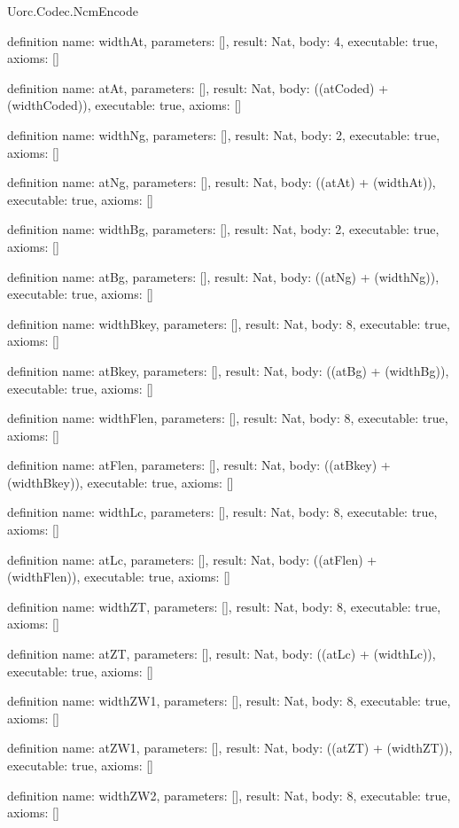 \begin{lexlean}{Uorc.Codec.NcmEncode}
\begin{semanticmodule}
definition{
  name: widthAt,
  parameters: [],
  result: Nat,
  body: 4,
  executable: true,
  axioms: []
}

definition{
  name: atAt,
  parameters: [],
  result: Nat,
  body: ((atCoded) + (widthCoded)),
  executable: true,
  axioms: []
}

definition{
  name: widthNg,
  parameters: [],
  result: Nat,
  body: 2,
  executable: true,
  axioms: []
}

definition{
  name: atNg,
  parameters: [],
  result: Nat,
  body: ((atAt) + (widthAt)),
  executable: true,
  axioms: []
}

definition{
  name: widthBg,
  parameters: [],
  result: Nat,
  body: 2,
  executable: true,
  axioms: []
}

definition{
  name: atBg,
  parameters: [],
  result: Nat,
  body: ((atNg) + (widthNg)),
  executable: true,
  axioms: []
}

definition{
  name: widthBkey,
  parameters: [],
  result: Nat,
  body: 8,
  executable: true,
  axioms: []
}

definition{
  name: atBkey,
  parameters: [],
  result: Nat,
  body: ((atBg) + (widthBg)),
  executable: true,
  axioms: []
}

definition{
  name: widthFlen,
  parameters: [],
  result: Nat,
  body: 8,
  executable: true,
  axioms: []
}

definition{
  name: atFlen,
  parameters: [],
  result: Nat,
  body: ((atBkey) + (widthBkey)),
  executable: true,
  axioms: []
}

definition{
  name: widthLc,
  parameters: [],
  result: Nat,
  body: 8,
  executable: true,
  axioms: []
}

definition{
  name: atLc,
  parameters: [],
  result: Nat,
  body: ((atFlen) + (widthFlen)),
  executable: true,
  axioms: []
}

definition{
  name: widthZT,
  parameters: [],
  result: Nat,
  body: 8,
  executable: true,
  axioms: []
}

definition{
  name: atZT,
  parameters: [],
  result: Nat,
  body: ((atLc) + (widthLc)),
  executable: true,
  axioms: []
}

definition{
  name: widthZW1,
  parameters: [],
  result: Nat,
  body: 8,
  executable: true,
  axioms: []
}

definition{
  name: atZW1,
  parameters: [],
  result: Nat,
  body: ((atZT) + (widthZT)),
  executable: true,
  axioms: []
}

definition{
  name: widthZW2,
  parameters: [],
  result: Nat,
  body: 8,
  executable: true,
  axioms: []
}


\end{semanticmodule}
\end{lexlean}
